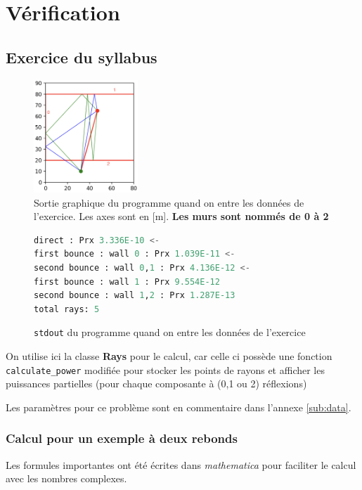 \documentclass[sn-mathphys-num]{sn-jnl}
\begin{document}
\section{Vérification}

\subsection{Exercice du syllabus}
\begin{figure}[H]
    \centering
    \includegraphics[width=0.35\textwidth]{images/verif/rayons.png}
    \caption{Sortie graphique du programme quand on entre les données de l'exercice. Les axes sont en [m]. \textbf{Les murs sont nommés de 0 à 2}}
    \label{f:ray_ex}
\end{figure}

\begin{figure}[H]
\begin{lstlisting}[language=python]
direct : Prx 3.336E-10 <-
first bounce : wall 0 : Prx 1.039E-11 <-
second bounce : wall 0,1 : Prx 4.136E-12 <-
first bounce : wall 1 : Prx 9.554E-12
second bounce : wall 1,2 : Prx 1.287E-13
total rays: 5
\end{lstlisting}
\caption{\texttt{stdout} du programme quand on entre les données de l'exercice}
\end{figure}

On utilise ici la classe \textbf{Rays} pour le calcul, car celle ci
possède une fonction \texttt{calculate\_power} modifiée pour stocker les
points de rayons et afficher les puissances partielles (pour chaque composante à (0,1 ou 2) réflexions)

Les paramètres pour ce problème sont en commentaire dans l'annexe \ref{sub:data}.
\subsubsection{Calcul pour un exemple à deux rebonds}
\label{subsub:2rebond}

Les formules importantes ont été écrites dans \textit{mathematica} pour faciliter
le calcul avec les nombres complexes. 
\end{document}
